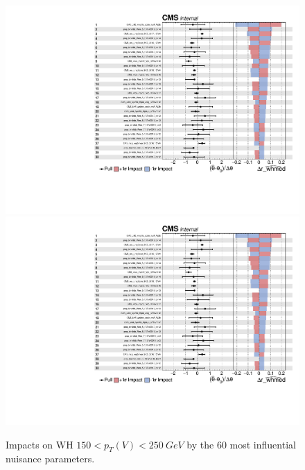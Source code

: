 \begin{figure}
  \centering
  \includegraphics[width=0.85\linewidth,page=1]{figures/impacts/impacts_r_whmed.pdf}
  \includegraphics[width=0.85\linewidth,page=2]{figures/impacts/impacts_r_whmed.pdf}
  \caption[Impacts for WH $150 < p_T(V) < \SI{250}{GeV}$]{
    Impacts on WH $150 < p_T(V) < \SI{250}{GeV}$ by the 60 most influential nuisance parameters.
  }
  \label{fig:impacts_r_whmed}
\end{figure}

